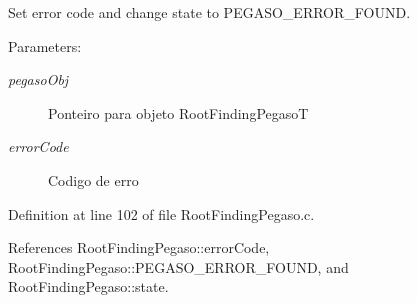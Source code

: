 Set error code and change state to PEGASO\_\-ERROR\_\-FOUND. 

\begin{Desc}
\item[Parameters:]
\begin{description}
\item[{\em pegasoObj}]Ponteiro para objeto RootFindingPegasoT \item[{\em errorCode}]Codigo de erro \end{description}
\end{Desc}


Definition at line 102 of file RootFindingPegaso.c.

References RootFindingPegaso::errorCode, RootFindingPegaso::PEGASO\_\-ERROR\_\-FOUND, and RootFindingPegaso::state.